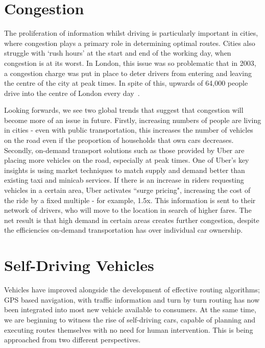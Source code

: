 \documentclass[ %
                    author={Alexander Hill},
                supervisor={Dr. Benjamin Sach},
                    degree={MEng},
                     title={MARMOSET},
                  subtitle={Multi-Agent Route Management using Online Simulation for Efficient Transportation},
                      type={research},
                      year={2016} ]{dissertation}
\begin{document}
\section{Congestion}

The proliferation of information whilst driving is particularly important in
cities, where congestion plays a primary role in determining optimal routes.
Cities also struggle with `rush hours' at the start and end of the working day,
when congestion is at its worst. In London, this issue was so problematic that
in 2003, a congestion charge was put in place to deter drivers from entering
and leaving the centre of the city at peak times. In spite of this, upwards of
64,000 people drive into the centre of London every day~\cite{tfl}.

Looking forwards, we see two global trends that suggest that congestion will
become more of an issue in future. Firstly, increasing numbers of people are
living in cities - even with public transportation, this increases the number of
vehicles on the road even if the proportion of households that own cars
decreases.  Secondly, on-demand transport solutions such as those provided by
Uber are placing more vehicles on the road, especially at peak times. One of
Uber's key insights is using market techniques to match supply and demand better
than existing taxi and minicab services. If there is an increase in riders
requesting vehicles in a certain area, Uber activates ``surge pricing",
increasing the cost of the ride by a fixed multiple - for example, 1.5x. This
information is sent to their network of drivers, who will move to the location
in search of higher fares. The net result is that high demand in certain areas
creates further congestion, despite the efficiencies on-demand transportation
has over individual car ownership.

\section{Self-Driving Vehicles}

Vehicles have improved alongside the development of effective routing
algorithms; GPS based navigation, with traffic information and turn by turn
routing has now been integrated into most new vehicle available to consumers. At
the same time, we are beginning to witness the rise of self-driving cars,
capable of planning and executing routes themselves with no need for human
intervention. This is being approached from two different perspectives.
\end{document}
